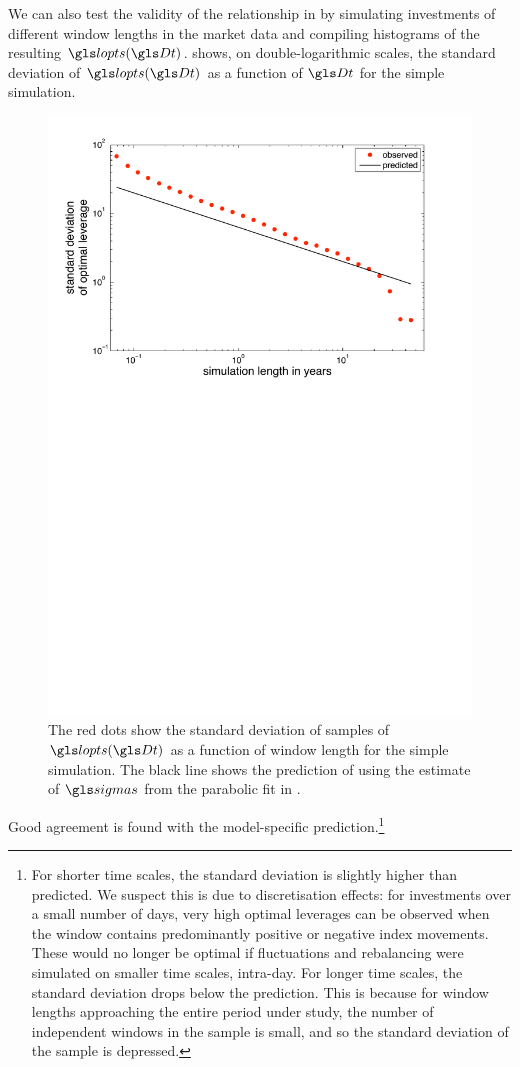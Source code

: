 We can also test the validity of the relationship in  by simulating investments of different window lengths in the market data and compiling histograms of the resulting $\lopts(\Dt)$.  shows, on double-logarithmic scales, the standard deviation of $\lopts(\Dt)$ as a function of $\Dt$ for the simple simulation.
\begin{figure}
\includegraphics[width=\textwidth]{./chapter_4/figs/sme_fig3.pdf}
\caption{The red dots show the standard deviation of samples of $\lopts(\Dt)$ as a function of window length for the simple simulation. The black line shows the prediction of  using the estimate of $\sigmas$ from the parabolic fit in .}
\end{figure}
Good agreement is found with the model-specific prediction.\footnote{For shorter time scales, the standard deviation is slightly higher than predicted. We suspect this is due to discretisation effects: for investments over a small number of days, very high optimal leverages can be observed when the window contains predominantly positive or negative index movements. These would no longer be optimal if fluctuations and rebalancing were simulated on smaller time scales, \ie intra-day. For longer time scales, the standard deviation drops below the prediction. This is because for window lengths approaching the entire period under study, the number of independent windows in the sample is small, and so the standard deviation of the sample is depressed.}

